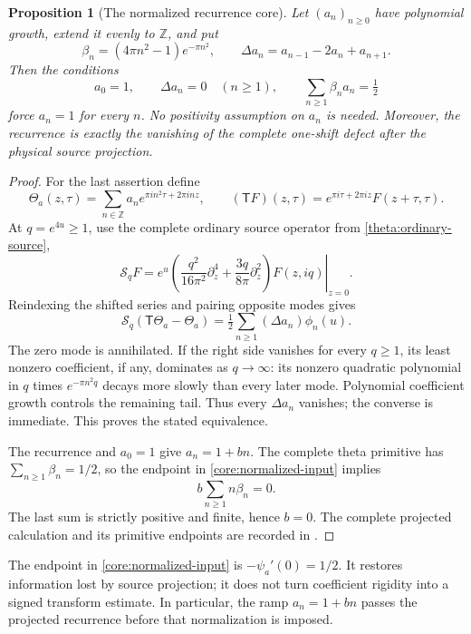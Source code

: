 \documentclass[11pt]{article}
\numberwithin{equation}{section}
\newtheorem{proposition}[theorem]{Proposition}
\theoremstyle{definition}
\theoremstyle{remark}
\begin{document}
\begin{proposition}[The normalized recurrence core]
\label{core:normalized-recurrence}
Let $(a_n)_{n\ge0}$ have polynomial growth, extend it evenly to $\mathbb Z$,
and put
\[
 \beta_n=(4\pi n^2-1)e^{-\pi n^2},\qquad
 \Delta a_n=a_{n-1}-2a_n+a_{n+1}.
\]
Then the conditions
\begin{equation}
 a_0=1,\qquad \Delta a_n=0\quad(n\ge1),\qquad
 \sum_{n\ge1}\beta_na_n=\tfrac12
 \label{core:normalized-input}
\end{equation}
force $a_n=1$ for every $n$.  No positivity assumption on $a_n$ is needed.
Moreover, the recurrence is exactly the vanishing of the complete
one-shift defect after the physical source projection.
\end{proposition}
\begin{proof}
For the last assertion define
\[
 \Theta_a(z,\tau)=\sum_{n\in\mathbb Z}
             a_ne^{\pi i n^2\tau+2\pi inz},\qquad
 (\mathsf TF)(z,\tau)=e^{\pi i\tau+2\pi iz}F(z+\tau,\tau).
\]
At $q=e^{4u}\ge1$, use the complete ordinary source operator
from \eqref{theta:ordinary-source},
\[
 \mathcal S_qF
 =\left.e^u\left(\frac{q^2}{16\pi^2}\partial_z^4
             +\frac{3q}{8\pi}\partial_z^2\right)F(z,iq)\right|_{z=0}.
\]
Reindexing the shifted series and pairing opposite modes gives
\begin{equation}
 \mathcal S_q(\mathsf T\Theta_a-\Theta_a)
       =\tfrac12\sum_{n\ge1}(\Delta a_n)\phi_n(u).
 \label{core:projected-recurrence}
\end{equation}
The zero mode is annihilated.  If the right side vanishes for every
$q\ge1$, its least nonzero coefficient, if any, dominates as $q\to\infty$:
its nonzero quadratic polynomial in $q$ times $e^{-\pi n^2q}$
decays more slowly than every later mode.  Polynomial coefficient growth
controls the remaining tail.  Thus every $\Delta a_n$ vanishes;
the converse is immediate.  This proves the stated equivalence.

The recurrence and $a_0=1$ give $a_n=1+bn$.  The complete theta primitive
has $\sum_{n\ge1}\beta_n=1/2$, so the endpoint in
\eqref{core:normalized-input} implies
\[
 b\sum_{n\ge1}n\beta_n=0.
\]
The last sum is strictly positive and finite, hence $b=0$.
The complete projected calculation and its primitive endpoints are
recorded in \cite{ThetaEllipticCore}.
\end{proof}

The endpoint in \eqref{core:normalized-input} is
$-\psi_a'(0)=1/2$.  It restores information lost by source projection;
it does not turn coefficient rigidity into a signed transform estimate.
In particular, the ramp $a_n=1+bn$ passes the projected recurrence
before that normalization is imposed.
\end{document}
